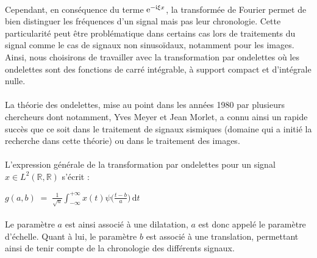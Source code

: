 \documentclass[a4paper,10pt]{report}
\theoremstyle{break}
\begin{document}
  \paragraph{} Cependant, en cons\'{e}quence du terme $\mathrm {e} ^{-{\rm {i}}\xi x}$, la transform\'{e}e de Fourier permet de bien distinguer
    les fr\'{e}quences d'un signal mais pas leur chronologie. Cette particularit\'{e} peut \^{e}tre probl\'{e}matique dans
    certains cas lors de traitements du signal comme le cas de signaux non sinuso\"{i}daux, notamment pour les images. 
    Ainsi, nous choisirons de travailler avec la transformation par ondelettes o\`{u} les ondelettes sont des fonctions 
    de carr\'{e} int\'{e}grable, \`{a} support compact et d'int\'{e}grale nulle.
    
  \paragraph{} La th\'{e}orie des ondelettes, mise au point dans les ann\'{e}es 1980 par plusieurs chercheurs dont notamment, Yves Meyer
    et Jean Morlet, a connu ainsi un rapide succ\`{e}s que ce soit dans le traitement de signaux sismiques (domaine qui a initi\'{e}
    la recherche dans cette th\'{e}orie) ou dans le traitement des images.
    
  \paragraph{} L'expression g\'{e}n\'{e}rale de la transformation par ondelettes pour un signal $x \in L^2(\mathbb{R}, \mathbb{R})$ s'\'{e}crit :
      \begin{center}
	${\displaystyle g(a,b) \; = \; \frac{1}{\sqrt{a}} \int _{-\infty }^{+\infty }x(t)\psi \Big( \frac{t-b}{a} \Big)\, \mathrm{d}t}$
      \end{center}

  \paragraph{} Le param\`{e}tre $a$ est ainsi associ\'{e} \`{a} une dilatation, $a$ est donc appel\'{e} le param\`{e}tre d'\'{e}chelle.
      Quant \`{a} lui, le param\`{e}tre $b$ est associ\'{e} \`{a} une translation, permettant ainsi de tenir compte de la chronologie des
      diff\'{e}rents signaux.
      
      
\end{document}
